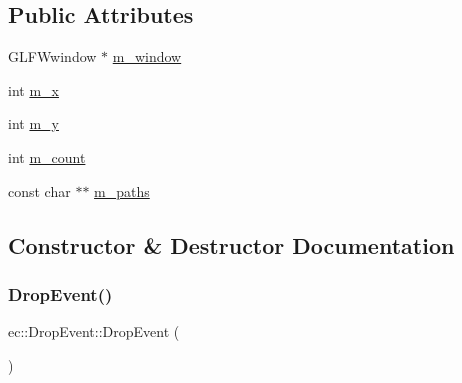 \subsection*{Public Attributes}
\begin{DoxyCompactItemize}
\item 
G\+L\+F\+Wwindow $\ast$ \mbox{\hyperlink{structec_1_1_drop_event_a526c7694184ab65111ca5f8f4f2384fa}{m\+\_\+window}}
\item 
int \mbox{\hyperlink{structec_1_1_drop_event_ae1b8807808b78aecbdb27d51a4ab87eb}{m\+\_\+x}}
\item 
int \mbox{\hyperlink{structec_1_1_drop_event_a59338dd4b8cd47b7f025908a63be2e92}{m\+\_\+y}}
\item 
int \mbox{\hyperlink{structec_1_1_drop_event_a63c1174cdefa0a30b15667c9fa070a41}{m\+\_\+count}}
\item 
const char $\ast$$\ast$ \mbox{\hyperlink{structec_1_1_drop_event_ad7bdb28144cd5ccb2c13c4dbacff40cb}{m\+\_\+paths}}
\end{DoxyCompactItemize}


\subsection{Constructor \& Destructor Documentation}
\mbox{\label{structec_1_1_drop_event_a6ae6f5be022c3809bc204c365dc11cbc}} 
\subsubsection{\texorpdfstring{Drop\+Event()}{DropEvent()}\hspace{0.1cm}{\footnotesize\ttfamily [1/2]}}
{\footnotesize\ttfamily ec\+::\+Drop\+Event\+::\+Drop\+Event (\begin{DoxyParamCaption}{ }\end{DoxyParamCaption})\hspace{0.3cm}{\ttfamily [explicit]}}

\mbox{\label{structec_1_1_drop_event_a747bca8a2d976f326dd9eb6d18bd8712}} 

